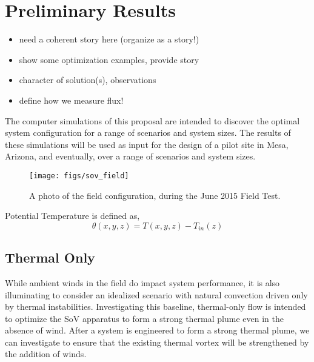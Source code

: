  
\section{Preliminary Results}
\label{sec:results}

\begin{itemize}
\item need a coherent story here (organize as a story!)
\item show some optimization examples, provide story
\item character of solution(s), observations
\item define how we measure flux!
\end{itemize}



The computer simulations of this proposal are intended to discover the
optimal system configuration for a range of scenarios and system
sizes. The results of these simulations will be used as input for the
design of a pilot site in Mesa, Arizona, and eventually, over a range of
scenarios and system sizes. 

  \begin{figure}[!htb]
   \begin{center}
    \texttt{[image: figs/sov\_field]}
    \caption{A photo of the field configuration, during the June 2015
    Field Test.}
    \label{fig:field_real}
   \end{center}
  \end{figure}

Potential Temperature is defined as,
\begin{equation}
  \theta(x,y,z) = T(x,y,z) -T_{in}(z) 
\end{equation}


\subsection{Thermal Only}

While ambient winds in the field do impact system performance, it is
also illuminating to consider an idealized scenario with natural convection
driven only by thermal instabilities. Investigating this baseline,
thermal-only flow is intended to optimize the SoV apparatus to form a
strong thermal plume even in the absence of wind. After a system is
engineered to form a strong thermal plume, we can investigate to ensure
that the existing thermal vortex will be strengthened by the addition of
winds. 

